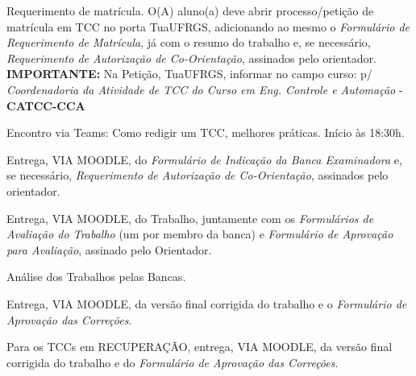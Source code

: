     {Requerimento de matrícula. O(A) aluno(a) deve abrir processo/petição de matrícula em TCC no porta TuaUFRGS, adicionando ao mesmo o \emph{Formulário de Requerimento de Matrícula}, já com o resumo do trabalho e, se necessário, \emph{Requerimento de Autorização de Co-Orientação}, assinados pelo orientador.
    \newline \textbf{IMPORTANTE:} Na Petição, TuaUFRGS, informar no campo curso: p/ \emph{Coordenadoria da Atividade de TCC do Curso em Eng. Controle e Automação} - \textbf{CATCC-CCA}
     }

    {Encontro via Teams: Como redigir um TCC, melhores práticas. Início às 18:30h.}%

    {Entrega, VIA MOODLE, do  \emph{Formulário de Indicação da Banca Examinadora} e, se necessário, \emph{Requerimento de Autorização de Co-Orientação}, assinados pelo orientador. }

    {Entrega, VIA MOODLE, do Trabalho, juntamente com os \emph{Formulários de Avaliação do Trabalho} (um por membro da banca) e \emph{Formulário de Aprovação para Avaliação}, assinado pelo Orientador.}

    {Análise dos Trabalhos pelas Bancas.}%

    {Entrega, VIA MOODLE, da versão final corrigida do trabalho e o \emph{Formulário de Aprovação das Correções}.}

    {Para os TCCs em RECUPERAÇÃO, entrega, VIA MOODLE, da versão final corrigida do trabalho e do \emph{Formulário de Aprovação das Correções}.}


